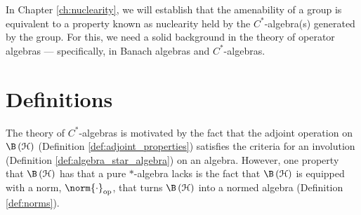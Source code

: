 In Chapter \ref{ch:nuclearity}, we will establish that the amenability of a group is equivalent to a property known as nuclearity held by the $C^{\ast}$-algebra(s) generated by the group. For this, we need a solid background in the theory of operator algebras --- specifically, in Banach algebras and $C^{\ast}$-algebras.
\section{Definitions}%
The theory of $C^{\ast}$-algebras is motivated by the fact that the adjoint operation on $\B\left( \mathcal{H} \right)$ (Definition \ref{def:adjoint_properties}) satisfies the criteria for an involution (Definition \ref{def:algebra_star_algebra}) on an algebra. However, one property that $\B\left( \mathcal{H} \right)$ has that a pure $\ast$-algebra lacks is the fact that $\B\left( \mathcal{H} \right)$ is equipped with a norm, $\norm{\cdot}_{\op}$, that turns $\B\left( \mathcal{H} \right)$ into a normed algebra (Definition \ref{def:norms}).\newline

